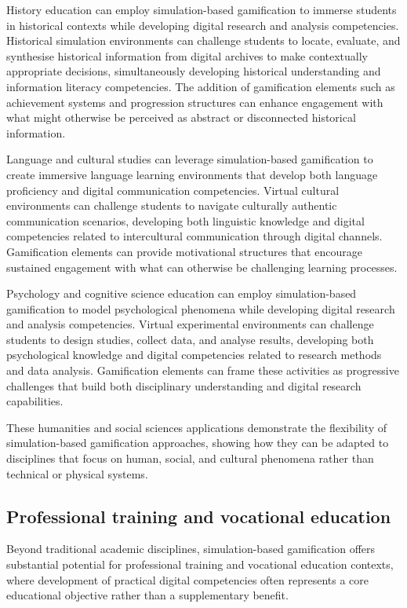 \documentclass[cte]{acnsart}
\begin{document}
History education can employ simulation-based gamification to immerse students in historical contexts while developing digital research and analysis competencies. Historical simulation environments can challenge students to locate, evaluate, and synthesise historical information from digital archives to make contextually appropriate decisions, simultaneously developing historical understanding and information literacy competencies. The addition of gamification elements such as achievement systems and progression structures can enhance engagement with what might otherwise be perceived as abstract or disconnected historical information.

Language and cultural studies can leverage simulation-based gamification to create immersive language learning environments that develop both language proficiency and digital communication competencies. Virtual cultural environments can challenge students to navigate culturally authentic communication scenarios, developing both linguistic knowledge and digital competencies related to intercultural communication through digital channels. Gamification elements can provide motivational structures that encourage sustained engagement with what can otherwise be challenging learning processes.

Psychology and cognitive science education can employ simulation-based gamification to model psychological phenomena while developing digital research and analysis competencies. Virtual experimental environments can challenge students to design studies, collect data, and analyse results, developing both psychological knowledge and digital competencies related to research methods and data analysis. Gamification elements can frame these activities as progressive challenges that build both disciplinary understanding and digital research capabilities.

These humanities and social sciences applications demonstrate the flexibility of simulation-based gamification approaches, showing how they can be adapted to disciplines that focus on human, social, and cultural phenomena rather than technical or physical systems.

\subsection{Professional training and vocational education}

Beyond traditional academic disciplines, simulation-based gamification offers substantial potential for professional training and vocational education contexts, where development of practical digital competencies often represents a core educational objective rather than a supplementary benefit.
\end{document}
